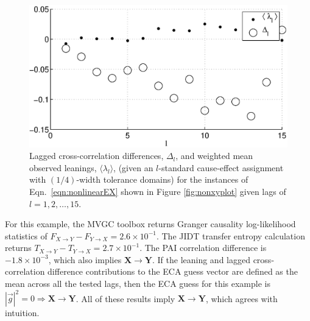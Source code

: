 \begin{figure}[ht]
\begin{center}
\includegraphics[scale=0.7]{NonlinearResponseExample_LandLCC.eps} 
\end{center}
\caption{Lagged cross-correlation differences, $\Delta_l$, and weighted mean observed leanings, $\langle\lambda_l\rangle$, (given an $l$-standard cause-effect assignment with $(1/4)$-width tolerance domains) for the instances of Eqn.\ \ref{eqn:nonlinearEX} shown in Figure \ref{fig:nonxyplot} given lags of $l=1,2,\ldots,15$.}
\label{fig:nonxyLandLCC}
\end{figure}

For this example, the MVGC toolbox returns Granger causality log-likelihood statistics of $F_{X\rightarrow Y}-F_{Y\rightarrow X}=2.6\times 10^{-1}$.  The JIDT transfer entropy calculation returns $T_{X\rightarrow Y}-T_{Y\rightarrow X}=2.7\times 10^{-1}$.  The PAI correlation difference is $-1.8\times 10^{-3}$, which also implies $\mathbf{X}\rightarrow\mathbf{Y}$.  If the leaning and lagged cross-correlation difference contributions to the ECA guess vector are defined as the mean across all the tested lags, then the ECA guess for this example is $|\vec{g}|^2=0\Rightarrow \mathbf{X}\rightarrow\mathbf{Y}$.  All of these results imply $\mathbf{X}\rightarrow\mathbf{Y}$, which agrees with intuition.    

